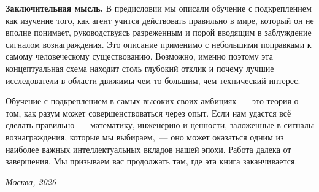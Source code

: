 \medskip

\textbf{Заключительная мысль.}\quad
В предисловии мы описали обучение с подкреплением как изучение того, как агент учится действовать правильно в мире, который он не вполне понимает, руководствуясь разреженным и порой вводящим в заблуждение сигналом вознаграждения. Это описание применимо с небольшими поправками к самому человеческому существованию. Возможно, именно поэтому эта концептуальная схема находит столь глубокий отклик и почему лучшие исследователи в области движимы чем-то большим, чем технический интерес.

Обучение с подкреплением в самых высоких своих амбициях~--- это теория о том, как разум может совершенствоваться через опыт. Если нам удастся всё сделать правильно~--- математику, инженерию и ценности, заложенные в сигналы вознаграждения, которые мы выбираем,~--- оно может оказаться одним из наиболее важных интеллектуальных вкладов нашей эпохи. Работа далека от завершения. Мы призываем вас продолжать там, где эта книга заканчивается.

\bigskip

\hfill\textit{Москва, 2026}
